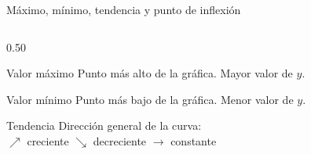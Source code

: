 \documentclass[aspectratio=169, 10pt, spanish]{beamer}
\begin{document}

\begin{frame}{Máximo, mínimo, tendencia y punto de inflexión}
  \begin{columns}[T]
    \begin{column}{0.50\textwidth}
      \begin{definicionbox}{Valor máximo}
        Punto más alto de la gráfica.
        Mayor valor de $y$.
      \end{definicionbox}

      \begin{definicionbox}{Valor mínimo}
        Punto más bajo de la gráfica.
        Menor valor de $y$.
      \end{definicionbox}

      \begin{definicionbox}{Tendencia}
        Dirección general de la curva:\\
        $\nearrow$ creciente \quad
        $\searrow$ decreciente \quad
        $\rightarrow$ constante
      \end{definicionbox}


\end{column}
\end{columns}
\end{frame}
\end{document}
